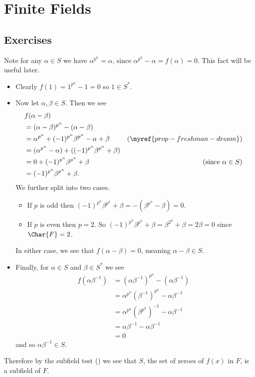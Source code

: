 \section{Finite Fields}
\subsection*{Exercises}
\begin{questions}
    \item Note for any $\alpha \in S$ we have $\alpha^{p^n} = \alpha$, since $\alpha^{p^n} - \alpha = f(\alpha) = 0$. This fact will be useful later.
    \begin{itemize}
        \item Clearly $f(1) = 1^{p^n} - 1 = 0$ so $1 \in S^\ast$.

        \item Now let $\alpha,\beta \in S$. Then we see
        \begin{align*}
            &f(\alpha - \beta)\\
            &= (\alpha-\beta)^{p^n} - (\alpha - \beta)\\
            &= \alpha^{p^n} + (-1)^{p^n}\beta^{p^n} - \alpha + \beta & (\myref{prop-freshman-dream})\\
            &= (\alpha^{p^n} - \alpha) + ((-1)^{p^n}\beta^{p^n} + \beta)\\
            &= 0 + (-1)^{p^n}\beta^{p^n} + \beta & (\text{since } \alpha \in S)\\
            &= (-1)^{p^n}\beta^{p^n} + \beta.
        \end{align*}
        We further split into two cases.
        \begin{itemize}
            \item If $p$ is odd then $(-1)^{p^n}\beta^{p^n} + \beta = -(\beta^{p^n} - \beta) = 0$.
            \item If $p$ is even then $p = 2$. So $(-1)^{p^n}\beta^{p^n} + \beta = \beta^{2^n} + \beta = 2\beta = 0$ since $\Char{F} = 2$.
        \end{itemize}
        In either case, we see that $f(\alpha-\beta) = 0$, meaning $\alpha - \beta \in S$.

        \item Finally, for $\alpha \in S$ and $\beta \in S^\ast$ we see
        \begin{align*}
            f(\alpha\beta^{-1}) &= (\alpha\beta^{-1})^{p^n} - (\alpha\beta^{-1})\\
            &= \alpha^{p^n}\left(\beta^{-1}\right)^{p^n} - \alpha\beta^{-1}\\
            &= \alpha^{p^n}\left(\beta^{p^n}\right)^{-1} - \alpha\beta^{-1}\\
            &= \alpha\beta^{-1} - \alpha\beta^{-1}\\
            &= 0
        \end{align*}
        and so $\alpha\beta^{-1} \in S$.
    \end{itemize}
    Therefore by the subfield test () we see that $S$, the set of zeroes of $f(x)$ in $F$, is a subfield of $F$.


\end{questions}
